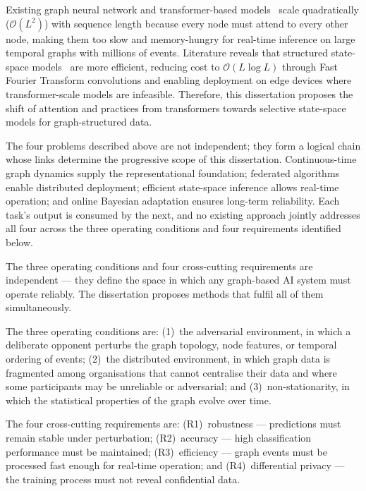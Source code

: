 Existing graph neural network and transformer-based models~\cite{Vaswani2017,Ying2021} scale quadratically ($\mathcal{O}(L^2)$) with sequence length because every node must attend to every other node, making them too slow and memory-hungry for real-time inference on large temporal graphs with millions of events. Literature reveals that structured state-space models~\cite{Gu2022,Gu2024,Dao2024} are more efficient, reducing cost to $\mathcal{O}(L\log L)$ through Fast Fourier Transform convolutions and enabling deployment on edge devices where transformer-scale models are infeasible. Therefore, this dissertation proposes the shift of attention and practices from transformers towards selective state-space models for graph-structured data.

The four problems described above are not independent; they form a logical chain whose links determine the progressive scope of this dissertation. Continuous-time graph dynamics supply the representational foundation; federated algorithms enable distributed deployment; efficient state-space inference allows real-time operation; and online Bayesian adaptation ensures long-term reliability. Each task's output is consumed by the next, and no existing approach jointly addresses all four across the three operating conditions and four requirements identified below.


The three operating conditions and four cross-cutting requirements are independent --- they define the space in which any graph-based AI system must operate reliably. The dissertation proposes methods that fulfil all of them simultaneously.

The three operating conditions are: (1)~the adversarial environment, in which a deliberate opponent perturbs the graph topology, node features, or temporal ordering of events; (2)~the distributed environment, in which graph data is fragmented among organisations that cannot centralise their data and where some participants may be unreliable or adversarial; and (3)~non-stationarity, in which the statistical properties of the graph evolve over time.

The four cross-cutting requirements are: (R1)~robustness --- predictions must remain stable under perturbation; (R2)~accuracy --- high classification performance must be maintained; (R3)~efficiency --- graph events must be processed fast enough for real-time operation; and (R4)~differential privacy --- the training process must not reveal confidential data.

